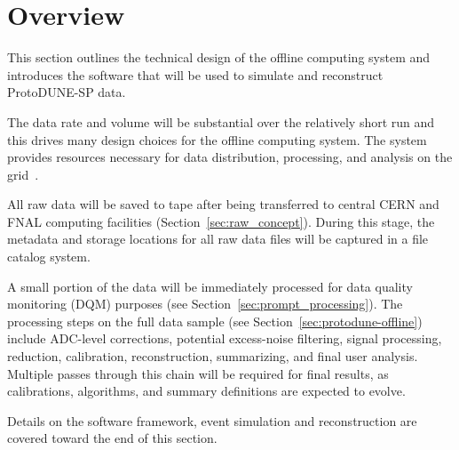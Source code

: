 \section{Overview}

This section outlines the technical design of the offline computing
system and introduces the software that will be used to simulate and reconstruct ProtoDUNE-SP data.


The data rate and volume will be substantial  over the relatively short
run and this drives many design choices for the offline computing
system.  The system provides resources necessary for data
distribution, processing, and analysis on the
grid~\cite{data_managm_sys}.

All raw data will be saved to tape after being transferred to central
CERN and FNAL computing facilities (Section~\ref{sec:raw_concept}).
During this stage, the metadata and storage locations for all raw data files
will be captured in a file catalog system.

A small portion of the data will be immediately processed for  
data quality monitoring (DQM) purposes (see Section~\ref{sec:prompt_processing}).
%
The processing steps on the full data sample (see
Section~\ref{sec:protodune-offline}) include ADC-level corrections,
potential excess-noise filtering, signal processing, reduction,
calibration, reconstruction, summarizing, and final user analysis.
Multiple passes through this chain will be required for final results,
as calibrations, algorithms, and summary definitions are expected to
evolve.  

Details on the software framework, event simulation and
reconstruction are covered toward the end of this section.

